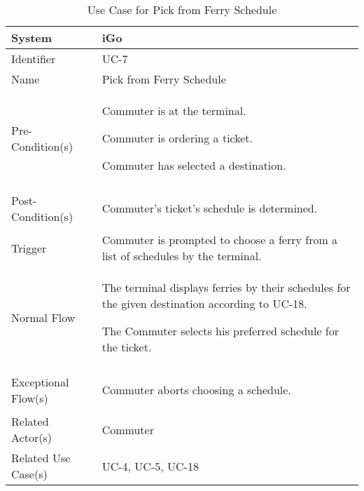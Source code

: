 \begin{table}[ht]
    \centering
    \begin{tabular}{|l|p{11cm}|}
        \hline
        System             & iGo\\
        \hline
        Identifier         & UC-7 \\
        \hline
        Name               & Pick from Ferry Schedule \\
        \hline
        Pre-Condition(s)   & 
        \begin{enumerate*}[itemjoin=\newline]
            \item Commuter is at the terminal.
            \item Commuter is ordering a ticket.
            \item Commuter has selected a destination.
        \end{enumerate*} \\
        \hline
        Post-Condition(s)  & 
        \begin{enumerate*}[itemjoin=\newline]
            \item Commuter's ticket's schedule is determined.
        \end{enumerate*} \\
        \hline
        Trigger            & Commuter is prompted to choose a ferry from a list of schedules by the terminal. \\
        \hline
        Normal Flow        & 
        \begin{enumerate*}[itemjoin=\newline]
            \item The terminal displays ferries by their schedules for the given destination according to UC-18.
            \item The Commuter selects his preferred schedule for the ticket.
        \end{enumerate*} \\
        \hline
        Exceptional Flow(s)& 
        \begin{enumerate*}[itemjoin=\newline]
            \item Commuter aborts choosing a schedule.
        \end{enumerate*} \\
        \hline
        Related Actor(s)   & Commuter \\
        \hline
        Related Use Case(s)& UC-4, UC-5, UC-18\\
        \hline
    \end{tabular}
    \caption{Use Case for Pick from Ferry Schedule}
    \label{tab:UC_PickFromFerrySchedule}
\end{table}

